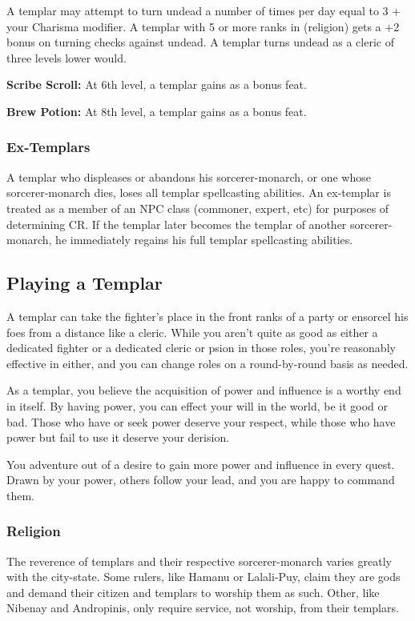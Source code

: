 A templar may attempt to turn undead a number of times per day equal to 3 + your Charisma modifier. A templar with 5 or more ranks in  (religion) gets a +2 bonus on turning checks against undead. A templar turns undead as a cleric of three levels lower would.

\textbf{Scribe Scroll:} At 6th level, a templar gains  as a bonus feat.

\textbf{Brew Potion:} At 8th level, a templar gains  as a bonus feat.

\subsubsection{Ex-Templars}
A templar who displeases or abandons his sorcerer-monarch, or one whose sorcerer-monarch dies, loses all templar spellcasting abilities. An ex-templar is treated as a member of an NPC class (commoner, expert, etc) for purposes of determining CR. If the templar later becomes the templar of another sorcerer-monarch, he immediately regains his full templar spellcasting abilities.


\subsection{Playing a Templar}
A templar can take the fighter's place in the front ranks of a party or ensorcel his foes from a distance like a cleric. While you aren't quite as good as either a dedicated fighter or a dedicated cleric or psion in those roles, you're reasonably effective in either, and you can change roles on a round-by-round basis as needed.

As a templar, you believe the acquisition of power and influence is a worthy end in itself. By having power, you can effect your will in the world, be it good or bad. Those who have or seek power deserve your respect, while those who have power but fail to use it deserve your derision.

You adventure out of a desire to gain more power and influence in every quest. Drawn by your power, others follow your lead, and you are happy to command them.

\subsubsection{Religion}
The reverence of templars and their respective sorcerer-monarch varies greatly with the city-state. Some rulers, like Hamanu or Lalali-Puy, claim they are gods and demand their citizen and templars to worship them as such. Other, like Nibenay and Andropinis, only require service, not worship, from their templars.

